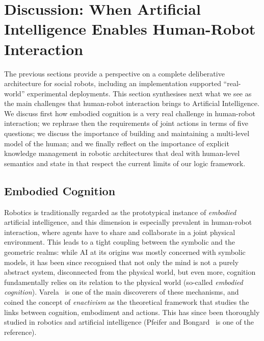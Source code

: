 \documentclass[preprint,3p,times]{elsarticle}
\begin{document}


\section{Discussion: When Artificial Intelligence Enables Human-Robot
Interaction}
\label{sect|discussion}

The previous sections provide a perspective on a complete deliberative
architecture for social robots, including an implementation supported
``real-world'' experimental deployments. This section synthesises next what we
see as the main challenges that human-robot interaction brings to Artificial
Intelligence.  We discuss first how embodied cognition is a very real challenge
in human-robot interaction; we rephrase then the requirements of joint actions
in terms of five questions; we discuss the importance of building and
maintaining a multi-level model of the human; and we finally reflect on the
importance of explicit knowledge management in robotic architectures that deal
with human-level semantics and state in that respect the current limits of our
logic framework.

\subsection{Embodied Cognition}

Robotics is traditionally regarded as the prototypical instance of
\emph{embodied} artificial intelligence, and this dimension is especially
prevalent in human-robot interaction, where agents have to share and
collaborate in a joint physical environment.  This leads to a tight coupling
between the symbolic and the geometric realms: while AI at its origins was
mostly concerned with symbolic models, it has been since recognised that not
only the mind is not a purely abstract system, disconnected from the physical
world, but even more, cognition fundamentally relies on its relation to the
physical world (so-called \emph{embodied cognition}). Varela~\cite{Varela1992}
is one of the main discoverers of these mechanisms, and coined the concept of
\emph{enactivism} as the theoretical framework that studies the links between
cognition, embodiment and actions.  This has since been thoroughly studied in
robotics and artificial intelligence (Pfeifer and
Bongard~\cite{pfeifer2007body} is one of the reference).
\end{document}
